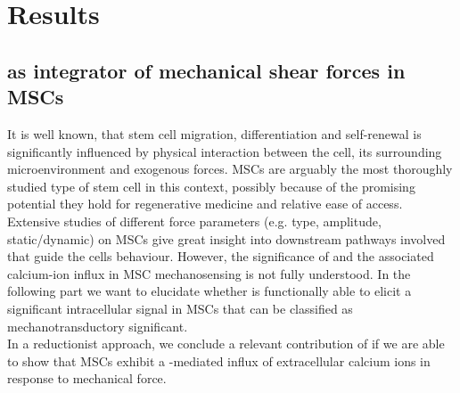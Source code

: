 \chapter{Results}



\section{\Piezo{} as integrator of mechanical shear forces in MSCs}
\label{sec:piezo1-as-integrator-of-biomecshanical-events-in-mscs}

It is well known, that stem cell migration, differentiation and self-renewal is significantly influenced by physical interaction between the cell, its surrounding microenvironment and exogenous forces. \cite{Eyckmans2011, Lee2011} MSCs are arguably the most thoroughly studied type of stem cell in this context, possibly because of the promising potential they hold for regenerative medicine and relative ease of access. Extensive studies of different force parameters (e.g. type, amplitude, static/dynamic) on MSCs give great insight into downstream pathways involved that guide the cells behaviour. However, the significance of \Piezo{} and the associated calcium-ion influx in MSC mechanosensing is not fully understood. In the following part we want to elucidate whether \Piezo{} is functionally able to elicit a significant intracellular signal in MSCs that can be classified as mechanotransductory significant.\\
In a reductionist approach, we conclude a relevant contribution of \Piezo{} if we are able to show that MSCs exhibit a \Piezo{}-mediated influx of extracellular calcium ions in response to mechanical force.\\

